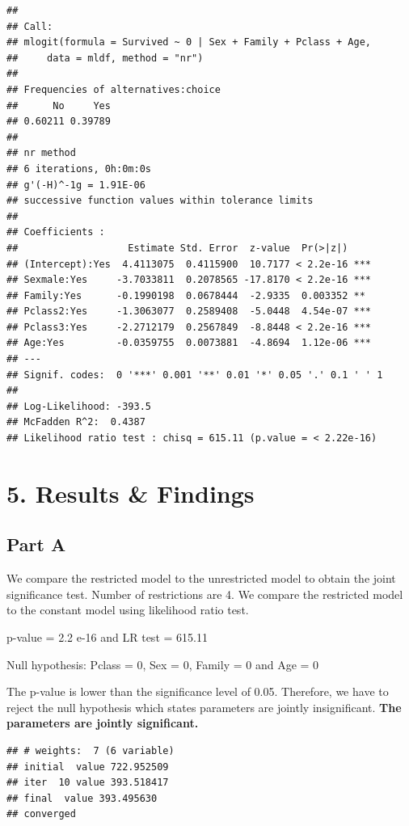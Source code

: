 \documentclass[
]{article}
\begin{document}
\begin{verbatim}
## 
## Call:
## mlogit(formula = Survived ~ 0 | Sex + Family + Pclass + Age, 
##     data = mldf, method = "nr")
## 
## Frequencies of alternatives:choice
##      No     Yes 
## 0.60211 0.39789 
## 
## nr method
## 6 iterations, 0h:0m:0s 
## g'(-H)^-1g = 1.91E-06 
## successive function values within tolerance limits 
## 
## Coefficients :
##                   Estimate Std. Error  z-value  Pr(>|z|)    
## (Intercept):Yes  4.4113075  0.4115900  10.7177 < 2.2e-16 ***
## Sexmale:Yes     -3.7033811  0.2078565 -17.8170 < 2.2e-16 ***
## Family:Yes      -0.1990198  0.0678444  -2.9335  0.003352 ** 
## Pclass2:Yes     -1.3063077  0.2589408  -5.0448  4.54e-07 ***
## Pclass3:Yes     -2.2712179  0.2567849  -8.8448 < 2.2e-16 ***
## Age:Yes         -0.0359755  0.0073881  -4.8694  1.12e-06 ***
## ---
## Signif. codes:  0 '***' 0.001 '**' 0.01 '*' 0.05 '.' 0.1 ' ' 1
## 
## Log-Likelihood: -393.5
## McFadden R^2:  0.4387 
## Likelihood ratio test : chisq = 615.11 (p.value = < 2.22e-16)
\end{verbatim}

\hypertarget{results-findings}{%
\section{5. Results \& Findings}\label{results-findings}}

\hypertarget{part-a}{%
\subsection{Part A}\label{part-a}}

We compare the restricted model to the unrestricted model to obtain the
joint significance test. Number of restrictions are 4. We compare the
restricted model to the constant model using likelihood ratio test.

p-value = 2.2 e-16 and LR test = 615.11

Null hypothesis: Pclass = 0, Sex = 0, Family = 0 and Age = 0

The p-value is lower than the significance level of 0.05. Therefore, we
have to reject the null hypothesis which states parameters are jointly
insignificant. \textbf{The parameters are jointly significant. }

\begin{verbatim}
## # weights:  7 (6 variable)
## initial  value 722.952509 
## iter  10 value 393.518417
## final  value 393.495630 
## converged
\end{verbatim}
\end{document}
